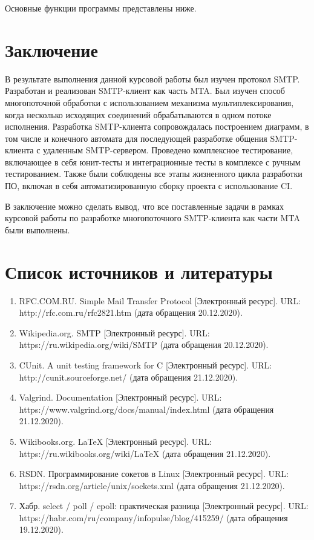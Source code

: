\documentclass[a4paper,12pt]{report}
\begin{document}
	Основные функции программы представлены ниже.

	
	
	   
	
	
	
		

	\section{Заключение}
	
	В результате выполнения данной курсовой работы был изучен протокол SMTP. Разработан и реализован SMTP-клиент как часть MTA. Был изучен способ многопоточной обработки с использованием механизма мультиплексирования, когда несколько исходящих соединений обрабатываются в одном потоке исполнения. Разработка SMTP-клиента сопровождалась построением диаграмм, в том числе и конечного автомата для последующей разработке общения SMTP-клиента с удаленным SMTP-сервером. Проведено комплексное тестирование, включающее в себя юнит-тесты и интеграционные тесты в комплексе с ручным тестированием. Также были соблюдены все этапы жизненного цикла разработки ПО, включая в себя автоматизированную сборку проекта с использование CI.
	
	В заключение можно сделать вывод, что все поставленные задачи в рамках курсовой работы по разработке многопоточного SMTP-клиента как части MTA были выполнены.

	\section{Список источников и литературы}
	\begin{enumerate}
		\item RFC.COM.RU. Simple Mail Transfer Protocol [Электронный ресурс]. URL: http://rfc.com.ru/rfc2821.htm (дата обращения 20.12.2020).
		\item Wikipedia.org. SMTP [Электронный ресурс]. URL: https://ru.wikipedia.org/wiki/SMTP (дата обращения 20.12.2020).
		\item CUnit. A unit testing framework for C [Электронный ресурс]. URL: http://cunit.sourceforge.net/ (дата обращения 21.12.2020).
		\item Valgrind. Documentation [Электронный ресурс]. URL: https://www.valgrind.org/docs/manual/index.html (дата обращения 21.12.2020).
		\item Wikibooks.org. LaTeX [Электронный ресурс]. URL: https://ru.wikibooks.org/wiki/LaTeX (дата обращения 21.12.2020).
		\item RSDN. Программирование сокетов в Linux [Электронный ресурс]. URL: https://rsdn.org/article/unix/sockets.xml (дата обращения 21.12.2020).
		\item Хабр. select / poll / epoll: практическая разница [Электронный ресурс]. URL: https://habr.com/ru/company/infopulse/blog/415259/ (дата обращения 19.12.2020).
	\end{enumerate}
	
	\newpage	
\end{document}
